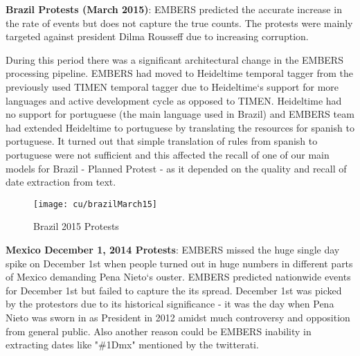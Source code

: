 \textbf{Brazil Protests (March 2015)}: EMBERS predicted the accurate
increase in the rate of events but does not capture the true counts. The
protests were mainly targeted against president Dilma Rousseff due to
increasing corruption. 

During this period there was a significant architectural change in the
EMBERS processing pipeline. EMBERS had moved to Heideltime temporal
tagger from the previously used TIMEN temporal tagger due to
Heideltime`s support for more languages and active development cycle as
opposed to TIMEN. Heideltime had no support for portuguese (the main
language used in Brazil) and EMBERS team had extended Heideltime to
portuguese by translating the resources for spanish to portuguese. It
turned out that simple translation of rules from spanish to portuguese
were not sufficient and this affected the recall of one of our main
models for Brazil - Planned Protest - as it depended on the quality and recall of
date extraction from text.

\begin{figure}[H]
\texttt{[image: cu/brazilMarch15]}
\caption{Brazil 2015 Protests}
\label{fig:brazilSpring}
\end{figure}


\textbf{Mexico December 1, 2014 Protests}:
EMBERS missed the huge single day spike on December 1st when
people turned out in huge numbers in different parts of Mexico demanding
Pena Nieto`s ouster.
EMBERS predicted nationwide events for December 1st but failed to
capture the its spread. December 1st was picked by the protestors due to
its historical significance - it was the day when Pena Nieto was sworn
in as President in 2012 amidst much controversy and opposition from
general public. Also another reason could be EMBERS inability in
extracting dates  like "\#1Dmx" mentioned by the twitterati.



